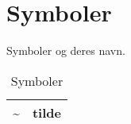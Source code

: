 \chapter{Symboler}
\label{app:symboler}
Symboler og deres navn.
\begin{table}[h]
  \centering
  \begin{tabular}{|l|c|}
    \textasciitilde & tilde \\
    \hline
  \end{tabular}
  \caption{Symboler}
\end{table}
